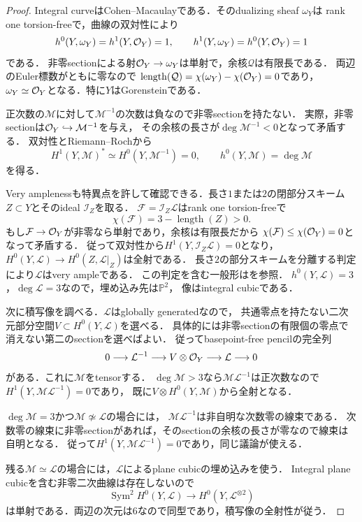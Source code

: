\documentclass[11pt,a4paper]{ltjsarticle}
\begin{document}
\begin{proof}
Integral curveはCohen--Macaulayである．そのdualizing sheaf $\omega_Y$は
rank one torsion-freeで，曲線の双対性により
\[
 h^0(Y,\omega_Y)=h^1(Y,\mathcal O_Y)=1,
 \qquad h^1(Y,\omega_Y)=h^0(Y,\mathcal O_Y)=1
\]
である\cite[Tags 0BS2, 0BS3]{Stacks}．
非零sectionによる射$\mathcal O_Y\to\omega_Y$は単射で，余核$\mathcal Q$は有限長である．
両辺のEuler標数がともに零なので
$\operatorname{length}(\mathcal Q)=\chi(\omega_Y)-\chi(\mathcal O_Y)=0$であり，
$\omega_Y\simeq\mathcal O_Y$となる．特に$Y$はGorensteinである．

正次数の$\mathcal M$に対して$\mathcal M^{-1}$の次数は負なので非零sectionを持たない．
実際，非零sectionは$\mathcal O_Y\hookrightarrow\mathcal M^{-1}$を与え，
その余核の長さが$\deg\mathcal M^{-1}<0$となって矛盾する．
双対性とRiemann--Rochから
\[
 H^1(Y,\mathcal M)^*\simeq H^0(Y,\mathcal M^{-1})=0,
 \qquad h^0(Y,\mathcal M)=\deg\mathcal M
\]
を得る．

Very amplenessも特異点を許して確認できる．長さ$1$または$2$の閉部分スキーム
$Z\subset Y$とそのideal $\mathcal I_Z$を取る．
$\mathcal F=\mathcal I_Z\mathcal L$はrank one torsion-freeで
\[
 \chi(\mathcal F)=3-\operatorname{length}(Z)>0.
\]
もし$\mathcal F\to\mathcal O_Y$が非零なら単射であり，余核は有限長だから
$\chi(\mathcal F)\leq\chi(\mathcal O_Y)=0$となって矛盾する．
従って双対性から$H^1(Y,\mathcal I_Z\mathcal L)=0$となり，
$H^0(Y,\mathcal L)\to H^0(Z,\mathcal L|_Z)$は全射である．
長さ$2$の部分スキームを分離する判定により$\mathcal L$はvery ampleである．
この判定を含む一般形は\cite[Tags 0E3A, 0H2V]{Stacks}を参照．
$h^0(Y,\mathcal L)=3$，$\deg\mathcal L=3$なので，埋め込み先は$\mathbb P^2$，
像はintegral cubicである．

次に積写像を調べる．$\mathcal L$はglobally generatedなので，
共通零点を持たない二次元部分空間$V\subset H^0(Y,\mathcal L)$を選べる．
具体的には非零sectionの有限個の零点で消えない第二のsectionを選べばよい．
従ってbasepoint-free pencilの完全列
\[
 0\longrightarrow\mathcal L^{-1}
 \longrightarrow V\otimes\mathcal O_Y
 \longrightarrow\mathcal L\longrightarrow0
\]
がある．これに$\mathcal M$をtensorする．
$\deg\mathcal M>3$なら$\mathcal M\mathcal L^{-1}$は正次数なので
$H^1(Y,\mathcal M\mathcal L^{-1})=0$であり，
既に$V\otimes H^0(Y,\mathcal M)$から全射となる．

$\deg\mathcal M=3$かつ$\mathcal M\not\simeq\mathcal L$の場合には，
$\mathcal M\mathcal L^{-1}$は非自明な次数零の線束である．
次数零の線束に非零sectionがあれば，そのsectionの余核の長さが零なので線束は自明となる．
従って$H^1(Y,\mathcal M\mathcal L^{-1})=0$であり，同じ議論が使える．

残る$\mathcal M\simeq\mathcal L$の場合には，$\mathcal L$によるplane cubicの埋め込みを使う．
Integral plane cubicを含む非零二次曲線は存在しないので
\[
 \operatorname{Sym}^2 H^0(Y,\mathcal L)
   \longrightarrow H^0(Y,\mathcal L^{\otimes2})
\]
は単射である．両辺の次元は$6$なので同型であり，積写像の全射性が従う．
\end{proof}
\end{document}

